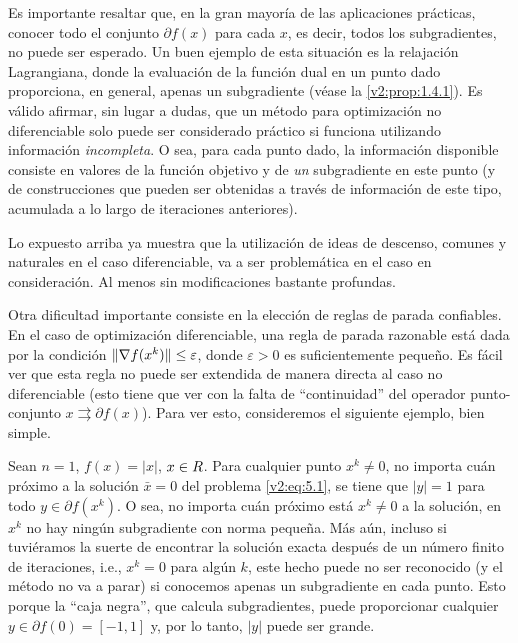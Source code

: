 Es importante resaltar que, en la gran mayoría de las aplicaciones prácticas, conocer todo el conjunto $\partial f(x)$ para cada $x$, es decir, todos los subgradientes, no puede ser esperado. Un buen ejemplo de esta situación es la relajación Lagrangiana, donde la evaluación de la función dual en un punto dado proporciona, en general, apenas un subgradiente (véase la \cref{v2:prop:1.4.1}). Es válido afirmar, sin lugar a dudas, que un método para optimización no diferenciable solo puede ser considerado práctico si funciona utilizando información \textit{incompleta}. O sea, para cada punto dado, la información disponible consiste en valores de la función objetivo y de \textit{un} subgradiente en este punto (y de construcciones que pueden ser obtenidas a través de información de este tipo, acumulada a lo largo de iteraciones anteriores).

Lo expuesto arriba ya muestra que la utilización de ideas de descenso, comunes y naturales en el caso diferenciable, va a ser problemática en el caso en consideración. Al menos sin modificaciones bastante profundas.

Otra dificultad importante consiste en la elección de reglas de parada confiables. En el caso de optimización diferenciable, una regla de parada razonable está dada por la condición $\lVert\nabla f(x^k)\rVert \le \varepsilon$, donde $\varepsilon > 0$ es suficientemente pequeño. Es fácil ver que esta regla no puede ser extendida de manera directa al caso no diferenciable (esto tiene que ver con la falta de ``continuidad'' del operador punto-conjunto $x \rightrightarrows \partial f(x)$). Para ver esto, consideremos el siguiente ejemplo, bien simple.

\begin{example}\label{v2:exa:5.0.2}
    Sean $n = 1$, $f(x) = |x|$, $x \in R$. Para cualquier punto $x^k \neq 0$, no importa cuán próximo a la solución $\bar{x} = 0$ del problema \eqref{v2:eq:5.1}, se tiene que $|y| = 1$ para todo $y \in \partial f(x^k)$. O sea, no importa cuán próximo está $x^k \neq 0$ a la solución, en $x^k$ no hay ningún subgradiente con norma pequeña. Más aún, incluso si tuviéramos la suerte de encontrar la solución exacta después de un número finito de iteraciones, i.e., $x^k = 0$ para algún $k$, este hecho puede no ser reconocido (y el método no va a parar) si conocemos apenas un subgradiente en cada punto. Esto porque la ``caja negra'', que calcula subgradientes, puede proporcionar cualquier $y \in \partial f(0) = [-1, 1]$ y, por lo tanto, $|y|$ puede ser grande.
\end{example}


